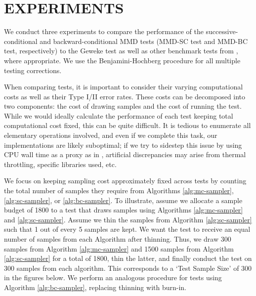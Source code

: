 \documentclass[a4paper,12pt]{article}
\begin{document}
\section{EXPERIMENTS}
We conduct three experiments to compare the performance of the successive-conditional and backward-conditional MMD tests (MMD-SC test and MMD-BC test, respectively) to the Geweke test as well as other benchmark tests from \cite{gandy_unit_2020}, where appropriate. We use the Benjamini-Hochberg procedure \cite{benjamini_controlling_1995} for all multiple testing corrections. 

When comparing tests, it is important to consider their varying computational costs as well as their Type I/II error rates. These costs can be decomposed into two components: the cost of drawing samples and the cost of running the test. While we would ideally calculate the performance of each test keeping total computational cost fixed, this can be quite difficult. It is tedious to enumerate all elementary operations involved, and even if we complete this task, our implementations are likely suboptimal; if we try to sidestep this issue by using CPU wall time as a proxy as in \cite{gandy_unit_2020}, artificial discrepancies may arise from thermal throttling, specific libraries used, etc. 

We focus on keeping sampling cost approximately fixed across tests by counting the total number of samples they require from Algorithms \ref{alg:mc-sampler}, \ref{alg:sc-sampler}, or \ref{alg:bc-sampler}. To illustrate, assume we allocate a sample budget of 1800 to a test that draws samples using Algorithms \ref{alg:mc-sampler} and \ref{alg:sc-sampler}. Assume we thin the samples from Algorithm \ref{alg:sc-sampler} such that 1 out of every 5 samples are kept. We want the test to receive an equal number of samples from each Algorithm after thinning. Thus, we draw 300 samples from Algorithm \ref{alg:mc-sampler} and 1500 samples from Algorithm \ref{alg:sc-sampler} for a total of 1800, thin the latter, and finally conduct the test on 300 samples from each algorithm. This corresponds to a `Test Sample Size' of 300 in the figures below. We perform an analogous procedure for tests using Algorithm \ref{alg:bc-sampler}, replacing thinning with burn-in.
\end{document}
